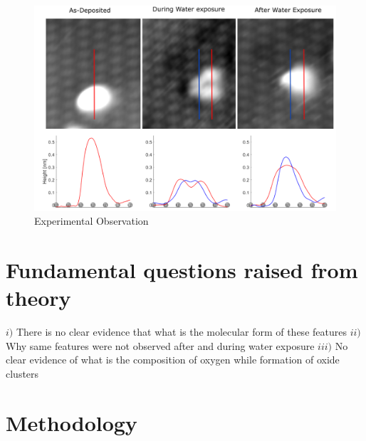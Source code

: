 \documentclass[aip,amsmath,amssymb,reprint, jcp]{revtex4-1}
\begin{document}
\begin{figure}[h]
\includegraphics[width=1.0\textwidth]{Expert_claim.png}
\caption{Experimental Observation}
\label{fig:exptobser}
\end{figure}

\section{Fundamental questions raised from theory}
$i)$ There is no clear evidence that what is the molecular form of these features
$ii)$  Why same features were not observed after and during water exposure 
$iii)$ No clear evidence of what is the composition of oxygen while formation of oxide clusters 

\section{Methodology}
\end{document}
